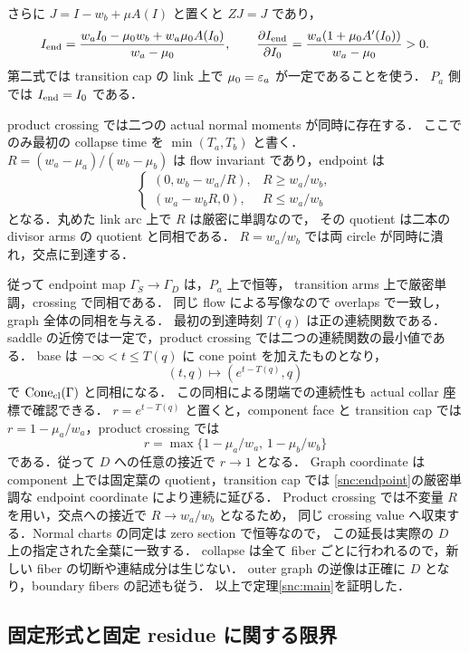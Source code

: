 さらに $J=I-w_b+\mu A(I)$ と置くと $ZJ=J$ であり，
\begin{equation}\label{snc:endpoint}
 I_{\rm end}
 =\frac{w_aI_0-\mu_0w_b+w_a\mu_0A(I_0)}{w_a-\mu_0},\qquad
 \frac{\partial I_{\rm end}}{\partial I_0}
 =\frac{w_a(1+\mu_0A'(I_0))}{w_a-\mu_0}>0.
\end{equation}
第二式では transition cap の link 上で $\mu_0=\varepsilon_a$ が一定であることを使う．
$P_a$ 側では $I_{\rm end}=I_0$ である．

product crossing では二つの actual normal moments が同時に存在する．
ここでのみ最初の collapse time を $\min(T_a,T_b)$ と書く．
$R=(w_a-\mu_a)/(w_b-\mu_b)$ は flow invariant であり，endpoint は
\[
 \begin{cases}
 (0,w_b-w_a/R),&R\geq w_a/w_b,\\
 (w_a-w_bR,0),&R\leq w_a/w_b
 \end{cases}
\]
となる．丸めた link arc 上で $R$ は厳密に単調なので，
その quotient は二本の divisor arms の quotient と同相である．
$R=w_a/w_b$ では両 circle が同時に潰れ，交点に到達する．

従って endpoint map $\Gamma_S\to\Gamma_D$ は，$P_a$ 上で恒等，
transition arms 上で厳密単調，crossing で同相である．
同じ flow による写像なので overlaps で一致し，graph 全体の同相を与える．
最初の到達時刻 $T(q)$ は正の連続関数である．
saddle の近傍では一定で，product crossing では二つの連続関数の最小値である．
base は $-\infty<t\leq T(q)$ に cone point を加えたものとなり，
\[
 (t,q)\longmapsto(e^{t-T(q)},q)
\]
で $\operatorname{Cone}_{\rm cl}(\Gamma)$ と同相になる．
この同相による閉端での連続性も actual collar 座標で確認できる．
$r=e^{t-T(q)}$ と置くと，component face と transition cap では
$r=1-\mu_a/w_a$，product crossing では
\[
 r=\max\{1-\mu_a/w_a,\,1-\mu_b/w_b\}
\]
である．従って $D$ への任意の接近で $r\to1$ となる．
Graph coordinate は component 上では固定葉の quotient，transition cap では
\eqref{snc:endpoint}の厳密単調な endpoint coordinate により連続に延びる．
Product crossing では不変量 $R$ を用い，交点への接近で $R\to w_a/w_b$ となるため，
同じ crossing value へ収束する．Normal charts の同定は zero section で恒等なので，
この延長は実際の $D$ 上の指定された全葉に一致する．
collapse は全て fiber ごとに行われるので，新しい fiber の切断や連結成分は生じない．
outer graph の逆像は正確に $D$ となり，boundary fibers の記述も従う．
以上で定理\ref{snc:main}を証明した．

\subsection{固定形式と固定 residue に関する限界}

